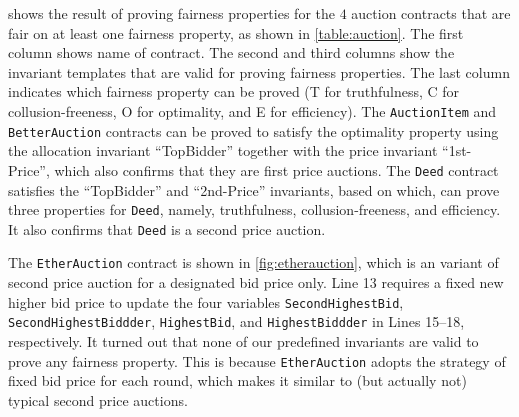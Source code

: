  shows the result of proving fairness properties for the $4$ auction
contracts that are fair on at least one fairness property, as shown in \cref{table:auction}. The
first column shows name of contract. The second and third columns show the invariant templates that
are valid for proving fairness properties. The last column indicates which fairness property can be
proved (T for truthfulness, C for collusion-freeness, O for optimality, and E for efficiency). The
\texttt{AuctionItem} and \texttt{BetterAuction} contracts can be proved to satisfy the optimality
property using the allocation invariant ``TopBidder'' together with the price invariant
``1st-Price'', which also confirms that they are first price auctions. The \texttt{Deed} contract
satisfies the ``TopBidder''  and ``2nd-Price'' invariants, based on which, \faircon can prove three
properties for \texttt{Deed}, namely, truthfulness, collusion-freeness, and efficiency. It also
confirms that \texttt{Deed} is a second price auction.

The \texttt{EtherAuction} contract is shown in \cref{fig:etherauction}, which is an variant of
second price auction for a designated bid price only.
Line 13 requires a fixed new higher bid price to update the four variables \texttt{SecondHighestBid}, \texttt{SecondHighestBiddder},
\texttt{HighestBid}, and \texttt{HighestBiddder} in Lines 15--18, respectively. It turned out
that none of our predefined invariants are valid to prove any fairness property. This is because
\texttt{EtherAuction} adopts the strategy of fixed bid price for each round, which makes it similar
to (but actually not) typical second price auctions.

